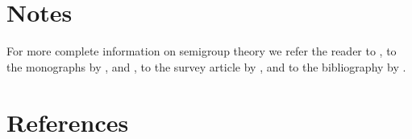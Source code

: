 \section*{Notes}
For more complete information on semigroup theory we refer the reader to \textcite{hillephillips:1957}, to the monographs by \textcite{davies:1980}, 
\textcite{goldstein:1985a} and \textcite{pazy:1983}, to the survey article by \textcite{kreinkhazan:1985}, and to the bibliography by 
\textcite{goldstein:1985b}. 
\section*{References}
{\RaggedRight
  \printbibliography[heading=none]
 }
